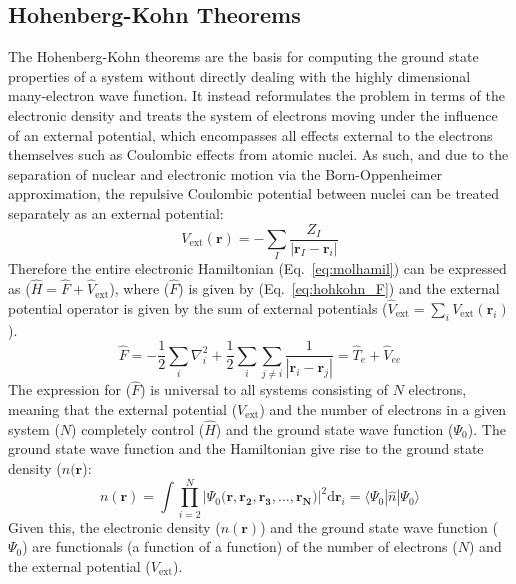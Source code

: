 \subsection{Hohenberg-Kohn Theorems}
%
The Hohenberg-Kohn theorems are the basis for computing the ground state properties of a system without directly dealing with the highly dimensional many-electron wave function. It instead reformulates the problem in terms of the electronic density and treats the system of electrons moving under the influence of an external potential, which encompasses all effects external to the electrons themselves such as Coulombic effects from atomic nuclei. As such, and due to the separation of nuclear and electronic motion via the Born-Oppenheimer approximation, the repulsive Coulombic potential between nuclei can be treated separately as an external potential:
%
\begin{equation}
V_{\mathrm{ext}}(\mathbf{r})=-\sum_{I} \frac{Z_{I}}{\left|\mathbf{r}_I-\mathbf{r}_i\right|}
\end{equation}
%
Therefore the entire electronic Hamiltonian (Eq.~\ref{eq:molhamil}) can be expressed as ($\hat{H} = \hat{F} + \hat{V}_{\mathrm{ext}}$), where ($\hat{F}$) is given by (Eq.~\ref{eq:hohkohn_F}) and the external potential operator is given by the sum of external potentials ($\hat{V}_{\mathrm{ext}} = \sum_i V_{\mathrm{ext}} (\mathbf{r}_i)$).
%
\begin{equation} \label{eq:hohkohn_F}
\hat{F}=-\frac{1}{2} \sum_{i} \nabla_{i}^{2}+\frac{1}{2} \sum_{i} \sum_{j \neq i} \frac{1}{\left|\mathbf{r}_{i}-\mathbf{r}_{j}\right|} = \hat{T}_e + \hat{V}_{ee}
\end{equation}
%
The expression for ($\hat{F}$) is universal to all systems consisting of $N$ electrons, meaning that the external potential ($V_{\mathrm{ext}}$) and the number of electrons in a given system ($N$) completely control ($\hat{H}$) and the ground state wave function ($\Psi_0$). The ground state wave function and the Hamiltonian give rise to the ground state density ($n(\mathbf{r}$):
%
\begin{equation} \label{density}
n(\mathbf{r}) = \int \prod_{i=2}^{N} | \Psi_0 (\mathbf{r, r_2, r_3, \dots, r_N)}|^2 \mathrm{d} \mathbf{r}_i = \langle \Psi_0 | \hat{n} |\Psi_0 \rangle
\end{equation} 
%
Given this, the electronic density ($n(\mathbf{r})$) and the ground state wave function ($\Psi_0$) are functionals (a function of a function) of the number of electrons ($N$) and the external potential ($V_{\mathrm{ext}}$). 
 
